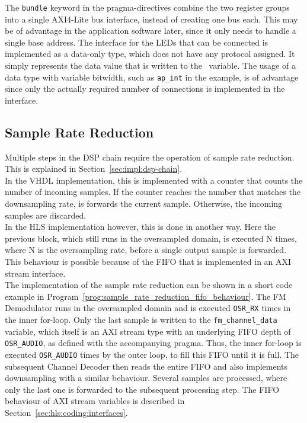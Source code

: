 The \texttt{bundle} keyword in the pragma-directives combine the two register groups into a single AXI4-Lite bus interface, instead of creating one bus each.
This may be of advantage in the application software later, since it only needs to handle a single base address.
The interface for the LEDs that can be connected is implemented as a data-only type, which does not have any protocol assigned.
It simply represents the data value that is written to the \cplusplus\ variable.
The usage of a data type with variable bitwidth, such as \texttt{ap\_int} in the example, is of advantage since only the actually required number of connections is implemented in the interface.

\subsection{Sample Rate Reduction}
\label{sec:impl:hls:sample_rate_reduction}

Multiple steps in the DSP chain require the operation of sample rate reduction.
This is explained in Section~\ref{sec:impl:dsp-chain}.\\

In the VHDL implementation, this is implemented with a counter that counts the number of incoming samples.
If the counter reaches the number that matches the downsampling rate, is forwards the current sample.
Otherwise, the incoming samples are discarded.\\

In the HLS implementation however, this is done in another way.
Here the previous block, which still runs in the oversampled domain, is executed N times, where N is the oversampling rate, before a single output sample is forwarded.
This behaviour is possible because of the FIFO that is implemented in an AXI stream interface.\\

The implementation of the sample rate reduction can be shown in a short code example in Program~\ref{prog:sample_rate_reduction_fifo_behaviour}.
The FM Demodulator runs in the oversampled domain and is executed \texttt{OSR\_RX} times in the inner for-loop.
Only the last sample is written to the \texttt{fm\_channel\_data} variable, which itself is an AXI stream type with an underlying FIFO depth of \texttt{OSR\_AUDIO}, as defined with the accompanying pragma.
Thus, the inner for-loop is executed \texttt{OSR\_AUDIO} times by the outer loop, to fill this FIFO until it is full.
The subsequent Channel Decoder then reads the entire FIFO and also implements downsampling with a similar behaviour.
Several samples are processed, where only the last one is forwarded to the subsequent processing step.
The FIFO behaviour of AXI stream variables is described in Section~\ref{sec:hls:coding:interfaces}.


